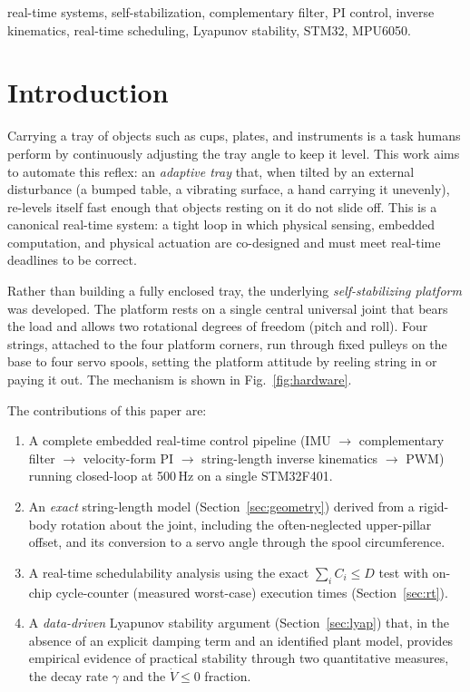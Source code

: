 \documentclass[conference]{IEEEtran}
\begin{document}
\begin{IEEEkeywords}
  real-time systems, self-stabilization, complementary filter, PI control,
  inverse kinematics, real-time scheduling, Lyapunov stability, STM32, MPU6050.
\end{IEEEkeywords}

\section{Introduction}
Carrying a tray of objects such as cups, plates, and instruments is a task humans
perform by continuously adjusting the tray angle to keep it level. This work aims
to automate this reflex: an \emph{adaptive tray} that, when tilted by an
external disturbance (a bumped table, a vibrating surface, a hand carrying it
unevenly), re-levels itself fast enough that objects resting on it do not slide
off. This is a canonical real-time system: a tight loop in which
physical sensing, embedded computation, and physical actuation are
co-designed and must meet real-time deadlines to be correct.

Rather than building a fully enclosed tray, the underlying
\emph{self-stabilizing platform} was developed. The platform rests on
a single central universal joint that bears the load and allows two rotational
degrees of freedom (pitch and roll). Four strings, attached to the four
platform corners, run through fixed pulleys on the base to four servo spools,
setting the platform attitude by reeling string in or paying it out. The mechanism
is shown in
Fig.~\ref{fig:hardware}.

The contributions of this paper are:
\begin{enumerate}
  \item A complete embedded real-time control pipeline (IMU $\rightarrow$ complementary
        filter $\rightarrow$ velocity-form PI $\rightarrow$ string-length
        inverse kinematics $\rightarrow$ PWM) running closed-loop at 500\,Hz on
        a single STM32F401.
  \item An \emph{exact} string-length model (Section~\ref{sec:geometry})
        derived from a rigid-body rotation about the joint, including the
        often-neglected upper-pillar offset, and its conversion to a servo
        angle through the spool circumference.
  \item A real-time schedulability analysis using the exact
        $\sum_i C_i \le D$ test with on-chip cycle-counter (measured
        worst-case) execution times (Section~\ref{sec:rt}).
  \item A \emph{data-driven} Lyapunov stability argument
        (Section~\ref{sec:lyap}) that, in the absence of an explicit damping
        term and an identified plant model, provides empirical evidence of
        practical stability through two quantitative measures, the decay rate $\gamma$ and the
        $\dot V \le 0$ fraction.
\end{enumerate}
\end{document}
